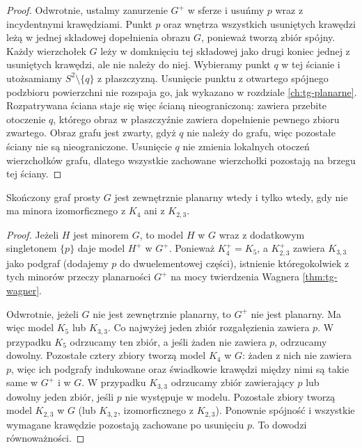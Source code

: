 \begin{proof}
Odwrotnie, ustalmy zanurzenie $G^+$ w sferze i usuńmy $p$
wraz z incydentnymi krawędziami. Punkt $p$ oraz
wnętrza wszystkich usuniętych krawędzi leżą
w jednej składowej dopełnienia obrazu $G$,
ponieważ tworzą zbiór spójny. Każdy wierzchołek
$G$ leży w domknięciu tej składowej jako drugi
koniec jednej z usuniętych krawędzi, ale nie
należy do niej. Wybieramy punkt $q$ w tej ścianie i utożsamiamy
$S^2\setminus\{q\}$ z płaszczyzną. Usunięcie punktu
z otwartego spójnego podzbioru powierzchni nie
rozspaja go, jak wykazano w rozdziale
\ref{ch:tg-planarne}. Rozpatrywana ściana staje się
więc ścianą nieograniczoną: zawiera przebite
otoczenie $q$, którego obraz w płaszczyźnie
zawiera dopełnienie pewnego zbioru zwartego.
Obraz grafu jest zwarty, gdyż $q$ nie należy do
grafu, więc pozostałe ściany nie są nieograniczone.
Usunięcie $q$ nie zmienia lokalnych otoczeń
wierzchołków grafu, dlatego wszystkie zachowane
wierzchołki pozostają na brzegu tej ściany.
\end{proof}

\begin{twierdzenie}
\label{thm:tg-outerplanar-minors}
Skończony graf prosty $G$ jest zewnętrznie planarny
wtedy i tylko wtedy, gdy nie ma minora izomorficznego
z $K_4$ ani z $K_{2,3}$.
\end{twierdzenie}

\begin{proof}
Jeżeli $H$ jest minorem $G$, to model $H$ w $G$
wraz z dodatkowym singletonem $\{p\}$ daje model
$H^+$ w $G^+$. Ponieważ $K_4^+=K_5$, a $K_{2,3}^+$
zawiera $K_{3,3}$ jako podgraf (dodajemy $p$ do
dwuelementowej części), istnienie któregokolwiek
z tych minorów przeczy planarności $G^+$ na mocy
twierdzenia Wagnera \ref{thm:tg-wagner}.

Odwrotnie, jeżeli $G$ nie jest zewnętrznie planarny,
to $G^+$ nie jest planarny. Ma więc model $K_5$
lub $K_{3,3}$. Co najwyżej jeden zbiór rozgałęzienia
zawiera $p$. W przypadku $K_5$ odrzucamy ten
zbiór, a jeśli żaden nie zawiera $p$, odrzucamy
dowolny. Pozostałe cztery zbiory tworzą model $K_4$ w $G$:
żaden z nich nie zawiera $p$, więc ich podgrafy
indukowane oraz świadkowie krawędzi między nimi
są takie same w $G^+$ i w $G$. W przypadku $K_{3,3}$ odrzucamy
zbiór zawierający $p$ lub dowolny jeden zbiór,
jeśli $p$ nie występuje w modelu. Pozostałe zbiory tworzą model $K_{2,3}$ w $G$
(lub $K_{3,2}$, izomorficznego z $K_{2,3}$).
Ponownie spójność i wszystkie wymagane krawędzie
pozostają zachowane po usunięciu $p$.
To dowodzi równoważności.
\end{proof}

